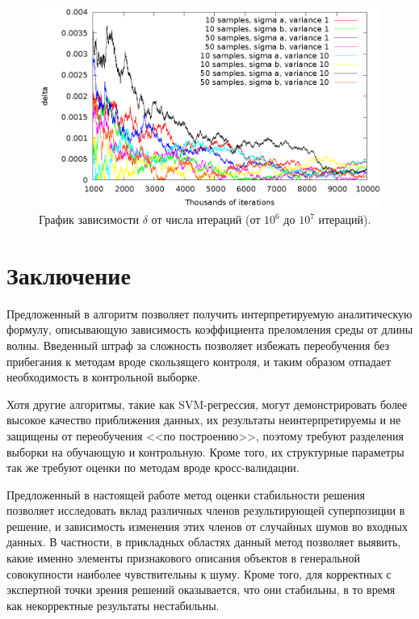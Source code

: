 \documentclass[12pt,a4paper]{article}
\theoremstyle{definition}
\begin{document}
\begin{figure}[h]
  \centering
  \includegraphics[scale=1.2]{figs/classic/variance_all_1000_all.eps}
  \caption{График зависимости $\delta$ от числа итераций (от $10^6$ до $10^7$ итераций).}
  \label{fig:classic_all_1000_all}
\end{figure}

\section{Заключение}

Предложенный в \cite{Rudoy13} алгоритм позволяет получить интерпретируемую аналитическую
формулу, описывающую зависимость коэффициента преломления среды от длины волны.
Введенный штраф за сложность позволяет избежать переобучения без прибегания к методам
вроде скользящего контроля, и таким образом отпадает необходимость в контрольной выборке.

Хотя другие алгоритмы, такие как SVM-регрессия, могут демонстрировать более высокое
качество приближения данных, их результаты неинтерпретируемы и не защищены от переобучения
<<по построению>>, поэтому требуют разделения выборки на обучающую и контрольную. Кроме
того, их структурные параметры так же требуют оценки по методам вроде кросс-валидации.

Предложенный в настоящей работе метод оценки стабильности решения позволяет исследовать вклад различных
членов результирующей суперпозиции в решение, и зависимость изменения этих членов от
случайных шумов во входных данных. В частности, в прикладных областях данный метод позволяет
выявить, какие именно элементы признакового описания объектов в генеральной совокупности
наиболее чувствительны к шуму. Кроме того, для корректных с экспертной точки зрения
решений оказывается, что они стабильны, в то время как некорректные результаты нестабильны.

\FloatBarrier


%
%

\end{document}
